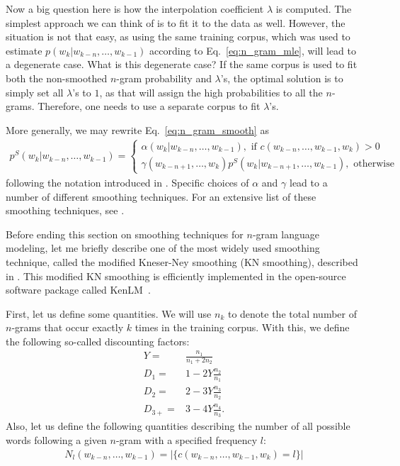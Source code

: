 \documentclass{report}
\begin{document}
Now a big question here is how the interpolation coefficient $\lambda$ is
computed. The simplest approach we can think of is to fit it to the data as
well. However, the situation is not that easy, as using the same training
corpus, which was used to estimate $p(w_k | w_{k-n}, \ldots, w_{k-1})$ according
to Eq.~\eqref{eq:n_gram_mle}, will lead to a degenerate case. What is this
degenerate case? If the same corpus is used to fit both the non-smoothed
$n$-gram probability and $\lambda$'s, the optimal solution is to simply set all
$\lambda$'s to $1$, as that will assign the high probabilities to all the
$n$-grams. Therefore, one needs to use a separate corpus to fit $\lambda$'s.

More generally, we may rewrite Eq.~\eqref{eq:n_gram_smooth} as
\begin{align}
    \label{eq:n_gram_smoothing_general}
    p^S(w_k | w_{k-n}, \ldots, w_{k-1}) = \left\{ 
        \begin{array}{l}
            \alpha(w_k | w_{k-n}, \ldots, w_{k-1}), \text{ if } c(w_{k-n},
            \ldots, w_{k-1}, w_k) > 0 \\
            \gamma(w_{k-n+1}, \ldots, w_{k}) p^S(w_{k}|w_{k-n+1}, \ldots,
            w_{k-1}), \text{ otherwise}
        \end{array}
        \right.
\end{align}
following the notation introduced in \cite{kneser1995improved}. Specific choices
of $\alpha$ and $\gamma$ lead to a number of different smoothing techniques. For
an extensive list of these smoothing techniques, see \cite{chen1996empirical}.

Before ending this section on smoothing techniques for $n$-gram language
modeling, let me briefly describe one of the most widely used smoothing
technique, called the modified Kneser-Ney smoothing (KN smoothing), described in
\cite{chen1996empirical}. This modified KN smoothing is efficiently implemented
in the open-source software package called KenLM~\cite{Heafield-estimate}.

First, let us define some quantities. We will use $n_k$ to denote the total
number of $n$-grams that occur exactly $k$ times in the training corpus. With
this, we define the following so-called discounting factors:
\begin{align*}
    Y =& \frac{n_1}{n_1 + 2 n_2} \\
    D_1 =& 1 - 2 Y \frac{n_2}{n_1} \\
    D_2 =& 2 - 3 Y \frac{n_3}{n_2} \\
    D_{3+} =& 3 - 4 Y \frac{n_4}{n_3}.
\end{align*}
Also, let us define the following quantities describing the number of all
possible words following a given $n$-gram with a specified frequency $l$:
\begin{align*}
    N_l(w_{k-n}, \ldots, w_{k-1}) = |\{ c(w_{k-n}, \ldots, w_{k-1}, w_k) = l \}|
\end{align*}
\end{document}
